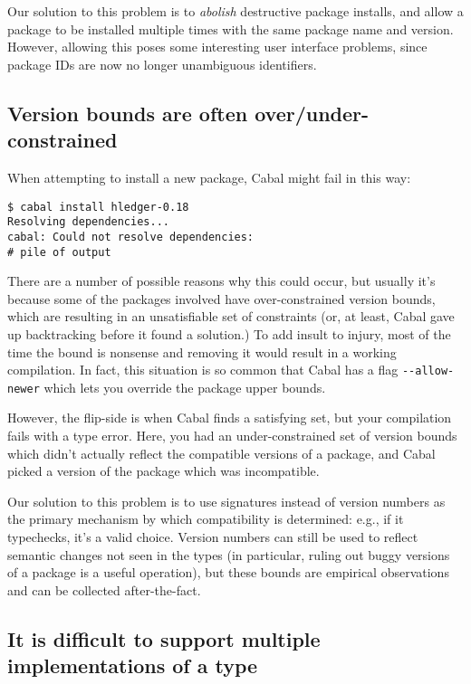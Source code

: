 \documentclass{article}
\begin{document}
Our solution to this problem is to \emph{abolish} destructive package
installs, and allow a package to be installed multiple times with the same
package name and version.  However, allowing this poses some interesting
user interface problems, since package IDs are now no longer unambiguous
identifiers.

\subsection{Version bounds are often over/under-constrained}

When attempting to install a new package, Cabal might fail in this way:

\begin{verbatim}
$ cabal install hledger-0.18
Resolving dependencies...
cabal: Could not resolve dependencies:
# pile of output
\end{verbatim}

There are a number of possible reasons why this could occur, but usually
it's because some of the packages involved have over-constrained version
bounds, which are resulting in an unsatisfiable set of constraints (or,
at least, Cabal gave up backtracking before it found a solution.)  To
add insult to injury, most of the time the bound is nonsense and removing
it would result in a working compilation.  In fact, this situation is
so common that Cabal has a flag \verb|--allow-newer| which lets you
override the package upper bounds.

However, the flip-side is when Cabal finds a satisfying set, but your
compilation fails with a type error.  Here, you had an under-constrained
set of version bounds which didn't actually reflect the compatible
versions of a package, and Cabal picked a version of the package which
was incompatible.

Our solution to this problem is to use signatures instead of version
numbers as the primary mechanism by which compatibility is determined:
e.g., if it typechecks, it's a valid choice.  Version numbers can still
be used to reflect semantic changes not seen in the types (in
particular, ruling out buggy versions of a package is a useful
operation), but these bounds are empirical observations and can be
collected after-the-fact.

\subsection{It is difficult to support multiple implementations of a type}
\end{document}
